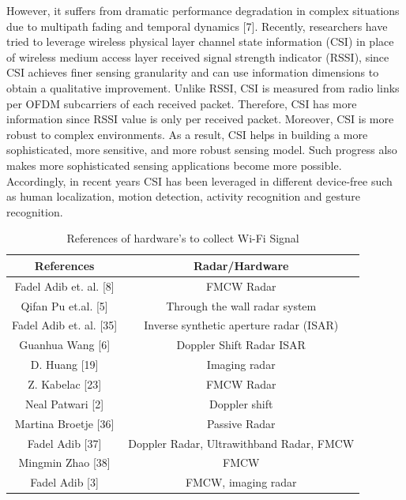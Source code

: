 \documentclass[conference]{IEEEtran}
\begin{document}
However, it suffers from dramatic performance
degradation in complex situations due to multipath fading
and temporal dynamics [7]. Recently, researchers have tried
to leverage wireless physical layer channel state information
(CSI) in place of wireless medium access layer received
signal strength indicator (RSSI), since CSI achieves finer
sensing granularity and can use information dimensions
to obtain a qualitative improvement. Unlike RSSI, CSI is
measured from radio links per 
OFDM subcarriers of each received packet.
Therefore, CSI has more information since RSSI value is
only per received packet. Moreover, CSI is more robust to
complex environments. As a result, CSI helps in building a
more sophisticated, more sensitive, and more robust sensing model. Such progress also makes more sophisticated sensing
applications become more possible. Accordingly, in recent
years CSI has been leveraged in different device-free such
as human localization, motion detection, activity recognition
and gesture recognition.

\begin{table}[h]
\caption{References of hardware's to collect Wi-Fi Signal}
\label{table_example}
\begin{center}
\begin{tabular}{|c||c|}
\hline
        References & Radar/Hardware  \\
\hline
Fadel Adib et. al. [8] & FMCW Radar \\
\hline
\hline
Qifan Pu et.al. [5] & Through the wall radar system \\
\hline
\hline
Fadel Adib et. al. [35] & Inverse synthetic aperture radar (ISAR) \\
\hline
Guanhua Wang [6] & Doppler Shift Radar ISAR \\
\hline
D. Huang [19] & Imaging radar \\
\hline
Z. Kabelac [23] & FMCW Radar \\
\hline
Neal Patwari [2] & Doppler shift \\
\hline
Martina Broetje [36] & Passive Radar \\
\hline
Fadel Adib [37] & Doppler Radar, Ultrawithband Radar, FMCW \\
\hline
Mingmin Zhao [38] & FMCW \\
\hline
Fadel Adib [3] & FMCW, imaging radar \\
\hline
\end{tabular}
\end{center}
\end{table}
\end{document}
